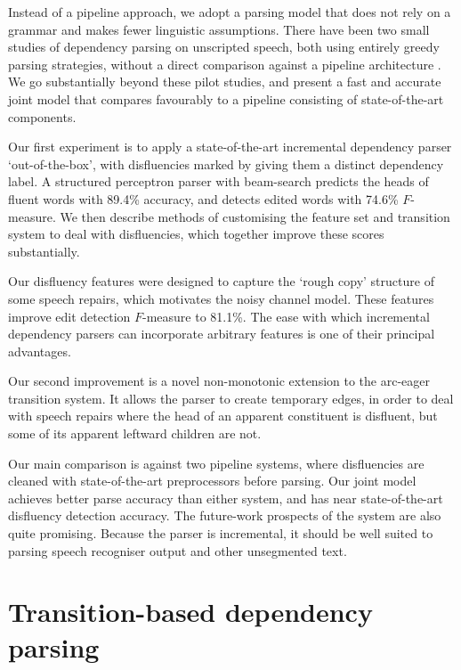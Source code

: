 \documentclass[11pt,letterpaper]{article}
\begin{document}
Instead of a pipeline approach, we adopt a parsing model that does not rely on
a grammar and makes fewer linguistic assumptions. There have been two small
studies of dependency parsing on unscripted speech, both using entirely greedy
parsing strategies, without a direct comparison against a pipeline architecture
\citep{jorgensen:07,tetrault:13}.  We go substantially beyond these pilot studies,
and present a fast and accurate joint model that compares favourably to a pipeline
consisting of state-of-the-art components.

Our first experiment is to apply a state-of-the-art incremental dependency parser
`out-of-the-box', with disfluencies marked by giving them a distinct
dependency label. A structured perceptron parser with beam-search
\citep{zhang:cl11,zhang:11} predicts the heads of fluent words
with 89.4\% accuracy, and detects edited words with 74.6\% $F$-measure.
We then describe methods of customising the feature set and transition system
to deal with disfluencies, which together improve these scores
substantially.

Our disfluency features were designed to capture the
`rough copy' structure of some speech repairs, which motivates the
\citet{Johnson04a} noisy channel model.  These features improve edit detection
$F$-measure to 81.1\%.  The ease with which incremental dependency parsers can
incorporate arbitrary features is one of their principal advantages.

Our second improvement is a novel non-monotonic extension to the arc-eager transition
system. It allows the parser to create temporary edges, in order to deal with
speech repairs where the head of an apparent constituent is disfluent, but some
of its apparent leftward children are not.

Our main comparison is against two pipeline systems, where disfluencies are cleaned
with state-of-the-art preprocessors before parsing.  Our joint model achieves
better parse accuracy than either system, and has near state-of-the-art disfluency
detection accuracy.  The future-work prospects of the system are also
quite promising.  Because the parser is incremental, it should be well suited
to parsing speech recogniser output and other unsegmented text.

\section{Transition-based dependency parsing}
\end{document}
